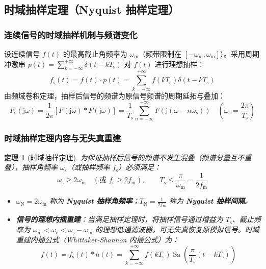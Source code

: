 \documentclass[11pt,a4paper,fontset=fandol]{ctexart}
\newtheorem{theorem}{定理}[section]
\theoremstyle{remark}
\begin{document}
\subsection{时域抽样定理（Nyquist 抽样定理）}

\subsubsection{连续信号的时域抽样机制与频谱变化}
设连续信号 $f(t)$ 的最高截止角频率为 $\omega_{\mathrm{m}}$（频带限制在 $[-\omega_{\mathrm{m}}, \omega_{\mathrm{m}}]$）。采用周期冲激串 $p(t) = \sum_{k=-\infty}^{+\infty} \delta(t - k T_{\mathrm{s}})$ 对 $f(t)$ 进行理想抽样：
\begin{equation}
    f_{\mathrm{s}}(t) = f(t) \cdot p(t) = \sum_{k=-\infty}^{+\infty} f(k T_{\mathrm{s}})\delta(t - k T_{\mathrm{s}})
\end{equation}
由频域卷积定理，抽样后信号的频谱为原信号频谱的周期延拓与叠加：
\begin{equation}
    F_{\mathrm{s}}(\mathrm{j}\omega) = \frac{1}{2\pi}[F(\mathrm{j}\omega) * P(\mathrm{j}\omega)] = \frac{1}{T_{\mathrm{s}}} \sum_{n=-\infty}^{+\infty} F(\mathrm{j}(\omega - n\omega_{\mathrm{s}})) \quad \left(\omega_{\mathrm{s}} = \frac{2\pi}{T_{\mathrm{s}}}\right)
\end{equation}

\subsubsection{时域抽样定理内容与无失真重建}
\begin{theorem}[时域抽样定理]
为保证抽样后信号的频谱不发生混叠（频谱分量互不重叠），抽样角频率 $\omega_{\mathrm{s}}$（或抽样频率 $f_{\mathrm{s}}$）必须满足：
\begin{equation}
    \omega_{\mathrm{s}} \ge 2\omega_{\mathrm{m}} \quad \left(\text{或 } f_{\mathrm{s}} \ge 2 f_{\mathrm{m}}\right), \qquad T_{\mathrm{s}} \le \frac{\pi}{\omega_{\mathrm{m}}} = \frac{1}{2 f_{\mathrm{m}}}
\end{equation}
\begin{itemize}
    \item $\omega_{\mathrm{N}} = 2\omega_{\mathrm{m}}$ 称为 \textbf{Nyquist 抽样角频率}；$T_{\mathrm{N}} = \frac{1}{2 f_{\mathrm{m}}}$ 称为 \textbf{Nyquist 抽样间隔}。
    \item \textbf{信号的理想内插重建}：当满足抽样定理时，将抽样信号通过增益为 $T_{\mathrm{s}}$、截止频率为 $\omega_{\mathrm{m}} < \omega_{\mathrm{c}} < \omega_{\mathrm{s}} - \omega_{\mathrm{m}}$ 的理想低通滤波器，可无失真恢复原模拟信号。时域重建内插公式（Whittaker-Shannon 内插公式）为：
    \begin{equation}
        f(t) = f_{\mathrm{s}}(t) * h(t) = \sum_{k=-\infty}^{+\infty} f(k T_{\mathrm{s}}) \operatorname{Sa}\left( \frac{\pi}{T_{\mathrm{s}}}(t - k T_{\mathrm{s}}) \right)
    \end{equation}
\end{itemize}
\end{theorem}
\end{document}

